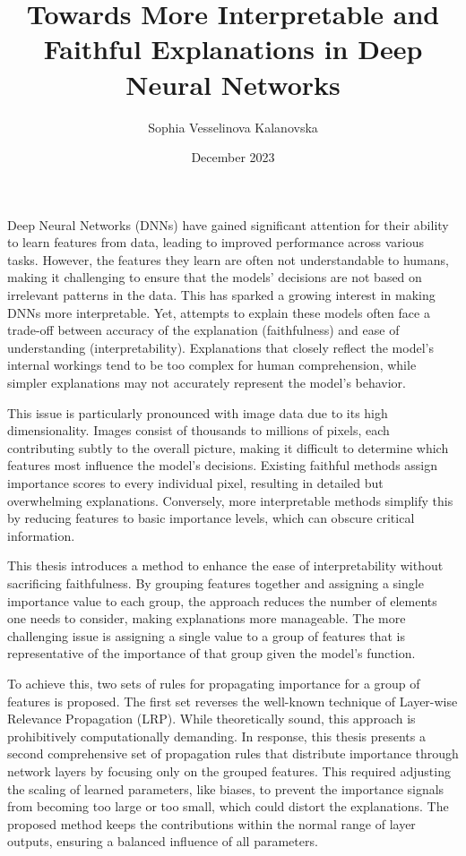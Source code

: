 \documentclass[12pt]{muthesis}
\theoremstyle{definition}
\begin{document}
\title{Towards More Interpretable and Faithful Explanations in Deep Neural Networks}
\author{Sophia Vesselinova Kalanovska}
\date{December 2023}
\maketitle


Deep Neural Networks (DNNs) have gained significant attention for their ability to learn features from data, leading to improved performance across various tasks. However, the features they learn are often not understandable to humans, making it challenging to ensure that the models' decisions are not based on irrelevant patterns in the data. This has sparked a growing interest in making DNNs more interpretable. Yet, attempts to explain these models often face a trade-off between accuracy of the explanation (faithfulness) and ease of understanding (interpretability). Explanations that closely reflect the model's internal workings tend to be too complex for human comprehension, while simpler explanations may not accurately represent the model's behavior.

\noindent
This issue is particularly pronounced with image data due to its high dimensionality. Images consist of thousands to millions of pixels, each contributing subtly to the overall picture, making it difficult to determine which features most influence the model's decisions. Existing faithful methods assign importance scores to every individual pixel, resulting in detailed but overwhelming explanations. Conversely, more interpretable methods simplify this by reducing features to basic importance levels, which can obscure critical information.

\noindent
This thesis introduces a method to enhance the ease of interpretability without sacrificing faithfulness. By grouping  features together and assigning a single importance value to each group, the approach reduces the number of elements one needs to consider, making explanations more manageable. The more challenging issue is assigning a single value to a group of features that is representative of the importance of that group given the model’s function.

\noindent
To achieve this, two sets of rules for propagating importance for a group of features is proposed. The first set reverses the well-known technique of Layer-wise Relevance Propagation (LRP). While theoretically sound, this approach is prohibitively computationally demanding. In response, this thesis presents a second comprehensive set of propagation rules that distribute importance through network layers by focusing only on the grouped features. This required adjusting the scaling of learned parameters, like biases, to prevent the importance signals from becoming too large or too small, which could distort the explanations. The proposed method keeps the contributions within the normal range of layer outputs, ensuring a balanced influence of all parameters.
\end{document}
